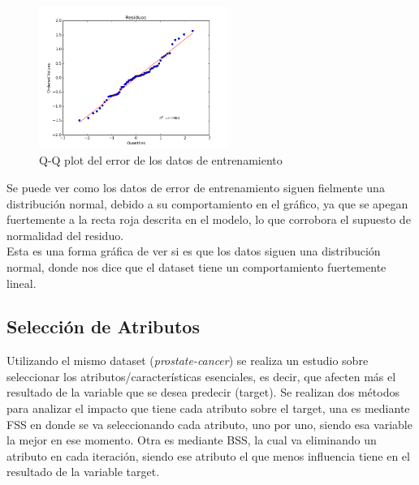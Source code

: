 \documentclass[10pt]{article}
\begin{document}
\begin{itemize}
\begin{figure}[h]
    \centering
    \includegraphics[width=0.55\textwidth]{images/qqplot}
    \caption{Q-Q plot del error de los datos de entrenamiento}
    \label{fig:mesh1}
\end{figure}

Se puede ver como los datos de error de entrenamiento siguen fielmente una distribución normal, debido a su comportamiento en el gráfico, ya que se apegan fuertemente a la recta roja descrita en el modelo, lo que corrobora el supuesto de normalidad del residuo.\\
Esta es una forma gráfica de ver si es que los datos siguen una distribución normal, donde nos dice que el dataset tiene un comportamiento fuertemente lineal.
\end{itemize}
 
 \newpage
\subsection{Selección de Atributos}
Utilizando el mismo dataset (\textit{prostate-cancer}) se realiza un estudio sobre seleccionar los atributos/características esenciales, es decir, que afecten más el resultado de la variable que se desea predecir (target). Se realizan dos métodos para analizar el impacto que tiene cada atributo sobre el target, una es mediante FSS en donde se va seleccionando cada atributo, uno por uno, siendo esa variable la mejor en ese momento. Otra es mediante BSS, la cual va eliminando un atributo en cada iteración, siendo ese atributo el que menos influencia tiene en el resultado de la variable target.
\end{document}
